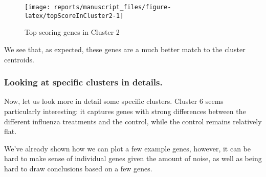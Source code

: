 \documentclass[9pt,a4paper,]{extarticle}
\newenvironment{Shaded}{\begin{snugshade}}{\end{snugshade}}
\newcommand{\CommentTok}[1]{\textcolor[rgb]{0.56,0.35,0.01}{\textit{#1}}}
\newcommand{\DataTypeTok}[1]{\textcolor[rgb]{0.13,0.29,0.53}{#1}}
\newcommand{\DecValTok}[1]{\textcolor[rgb]{0.00,0.00,0.81}{#1}}
\newcommand{\FloatTok}[1]{\textcolor[rgb]{0.00,0.00,0.81}{#1}}
\newcommand{\KeywordTok}[1]{\textcolor[rgb]{0.13,0.29,0.53}{\textbf{#1}}}
\newcommand{\NormalTok}[1]{#1}
\newcommand{\OperatorTok}[1]{\textcolor[rgb]{0.81,0.36,0.00}{\textbf{#1}}}
\newcommand{\OtherTok}[1]{\textcolor[rgb]{0.56,0.35,0.01}{#1}}
\newcommand{\StringTok}[1]{\textcolor[rgb]{0.31,0.60,0.02}{#1}}
\begin{document}
\begin{Shaded}
\end{Shaded}

\begin{figure}[H]

{\centering \texttt{[image: reports/manuscript\_files/figure-latex/topScoreInCluster2-1]} 

}

\caption{Top scoring genes in Cluster 2}\label{fig:topScoreInCluster2}
\end{figure}

We see that, as expected, these genes are a much better match to the cluster centroids.

\hypertarget{looking-at-specific-clusters-in-details.}{%
\subsubsection{Looking at specific clusters in details.}\label{looking-at-specific-clusters-in-details.}}

Now, let us look more in detail some specific clusters. Cluster 6 seems
particularly interesting: it captures genes with strong differences between
the different influenza treatments and the control, while the control remains
relatively flat.

We've already shown how we can plot a few example genes, however, it can be
hard to make sense of individual genes given the amount of noise, as well as
being hard to draw conclusions based on a few genes.
\end{document}
